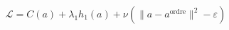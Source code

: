 \documentclass[preview]{standalone}
\begin{document}
\begin{align*}
\mathcal{L} = C(a) + \lambda_1 h_1(a) + \nu (\|a - a^{\text{ordre}}\|^2 - \varepsilon)
\end{align*}
\end{document}
